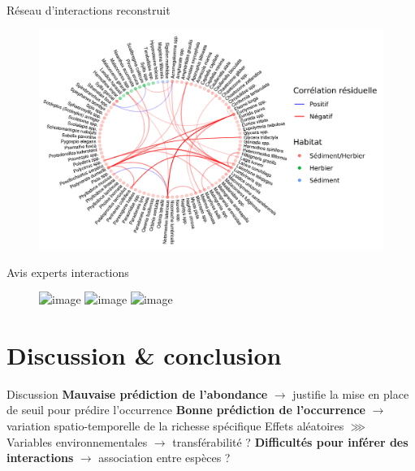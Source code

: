 \documentclass[%
]{beamer}
\begin{document}
	\begin{frame}{Réseau d'interactions reconstruit}
	\begin{figure}[t]
		\begin{center}
			\includegraphics[scale =0.85]{figs/mean-network-1.png}
		\end{center}
	\end{figure}
	\end{frame}
	
	\begin{frame}{Avis experts interactions}
	\begin{figure}[t]
		\begin{center}
			\includegraphics<1>[scale=0.07]{figs/expert-option-1-2.png}
			\includegraphics<2>[scale=0.07]{figs/expert-option-2-2.png}
			\includegraphics<3>[scale=0.07]{figs/expert-option-2-3.png}
		\end{center}
	\end{figure}
	\end{frame}
	
	\section{Discussion \& conclusion}
	\begin{frame}{Discussion}
		\textbf{Mauvaise prédiction de l'abondance} $\rightarrow$ justifie la mise en place de seuil pour prédire l'occurrence\pause\vfill
		\textbf{Bonne prédiction de l'occurrence} $\rightarrow$ variation spatio-temporelle de la richesse spécifique\pause\vfill
		Effets aléatoires $\ggg$ Variables environnementales $\rightarrow$ transférabilité ?\pause\vfill
		\textbf{Difficultés pour inférer des interactions} $\rightarrow$  association entre espèces ?
	\end{frame}
	
\end{document}
